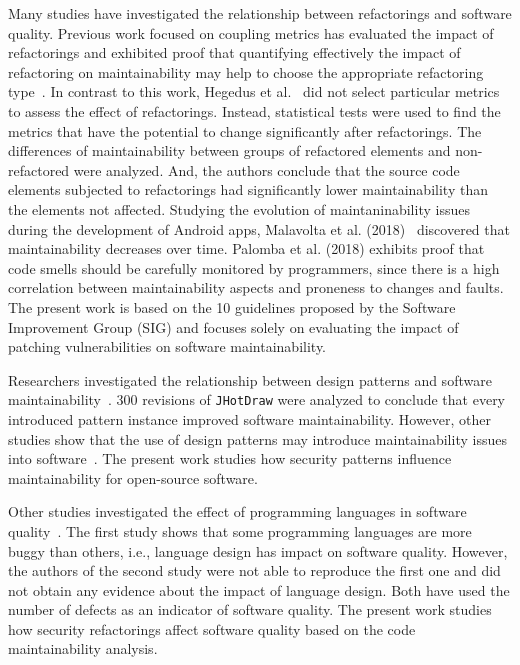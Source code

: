 \documentclass[10pt,conference]{IEEEtran}
\begin{document}
{Many studies have investigated the relationship between refactorings and software quality.
Previous work focused on coupling metrics has evaluated the impact of refactorings and
exhibited proof that quantifying effectively the impact of refactoring on maintainability
may help to choose the appropriate refactoring type~\cite{1167822}. In contrast to
this work, Hegedus et al.~\cite{HEGEDUS2018313} did not select particular metrics to
assess the effect of refactorings. Instead, statistical tests were used to find
the metrics that have the potential to change significantly after refactorings. 
The differences of maintainability between groups of refactored elements and 
non-refactored were analyzed. And, the authors conclude that the source
code elements subjected to refactorings had significantly lower maintainability
than the elements not affected. Studying the evolution of maintaninability issues during the development of Android apps, Malavolta et al. (2018)~\cite{8530041} discovered that maintainability 
decreases over time. Palomba et al. (2018)\cite{Palomba:2018:DIM:3231288.3231337} exhibits
proof that code smells should be carefully monitored by programmers, since there is
a high correlation between maintainability aspects and proneness to changes and faults.
The present work is based on the 10 guidelines proposed
by the Software Improvement Group (SIG) and focuses solely on evaluating
the impact of patching vulnerabilities on software maintainability.

Researchers investigated the relationship between design patterns and
software maintainability~\cite{10.1007/978-3-642-35267-6-18}. 300 revisions
of \texttt{JHotDraw} were analyzed to conclude that every introduced pattern
instance improved software maintainability. However, other studies show that the 
use of design patterns may introduce maintainability issues into software~\cite{4493325}.
The present work studies how security patterns influence maintainability
for open-source software.

Other studies investigated the effect of programming languages in software quality~\cite{Ray:2017:LSP:3144574.3126905,
2019arXiv190110220B}. The first study shows that some programming languages are more buggy than others, i.e., 
language design has impact on software quality. However, the authors of the second
study were not able to reproduce the first one and did not obtain any evidence about the 
impact of language design. Both have used the number of defects as an indicator of
software quality. The present work studies how security refactorings affect software quality
based on the code maintainability analysis. 

}
\end{document}
